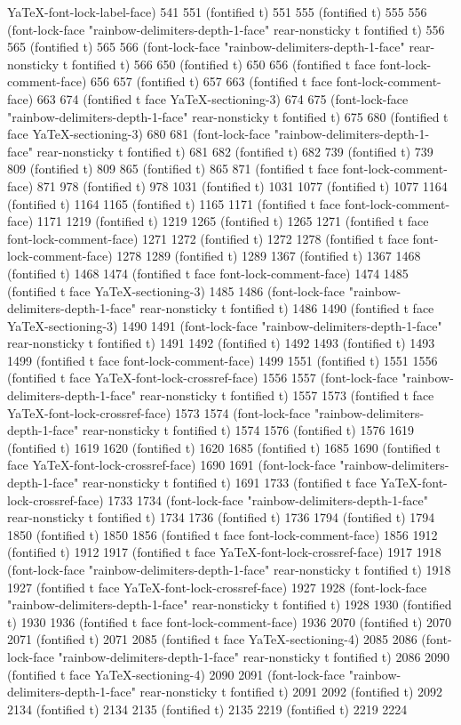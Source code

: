 YaTeX-font-lock-label-face) 541 551 (fontified t) 551 555 (fontified t) 555 556 (font-lock-face "rainbow-delimiters-depth-1-face" rear-nonsticky t fontified t) 556 565 (fontified t) 565 566 (font-lock-face "rainbow-delimiters-depth-1-face" rear-nonsticky t fontified t) 566 650 (fontified t) 650 656 (fontified t face font-lock-comment-face) 656 657 (fontified t) 657 663 (fontified t face font-lock-comment-face) 663 674 (fontified t face YaTeX-sectioning-3) 674 675 (font-lock-face "rainbow-delimiters-depth-1-face" rear-nonsticky t fontified t) 675 680 (fontified t face YaTeX-sectioning-3) 680 681 (font-lock-face "rainbow-delimiters-depth-1-face" rear-nonsticky t fontified t) 681 682 (fontified t) 682 739 (fontified t) 739 809 (fontified t) 809 865 (fontified t) 865 871 (fontified t face font-lock-comment-face) 871 978 (fontified t) 978 1031 (fontified t) 1031 1077 (fontified t) 1077 1164 (fontified t) 1164 1165 (fontified t) 1165 1171 (fontified t face font-lock-comment-face) 1171 1219 (fontified t) 1219 1265 (fontified t) 1265 1271 (fontified t face font-lock-comment-face) 1271 1272 (fontified t) 1272 1278 (fontified t face font-lock-comment-face) 1278 1289 (fontified t) 1289 1367 (fontified t) 1367 1468 (fontified t) 1468 1474 (fontified t face font-lock-comment-face) 1474 1485 (fontified t face YaTeX-sectioning-3) 1485 1486 (font-lock-face "rainbow-delimiters-depth-1-face" rear-nonsticky t fontified t) 1486 1490 (fontified t face YaTeX-sectioning-3) 1490 1491 (font-lock-face "rainbow-delimiters-depth-1-face" rear-nonsticky t fontified t) 1491 1492 (fontified t) 1492 1493 (fontified t) 1493 1499 (fontified t face font-lock-comment-face) 1499 1551 (fontified t) 1551 1556 (fontified t face YaTeX-font-lock-crossref-face) 1556 1557 (font-lock-face "rainbow-delimiters-depth-1-face" rear-nonsticky t fontified t) 1557 1573 (fontified t face YaTeX-font-lock-crossref-face) 1573 1574 (font-lock-face "rainbow-delimiters-depth-1-face" rear-nonsticky t fontified t) 1574 1576 (fontified t) 1576 1619 (fontified t) 1619 1620 (fontified t) 1620 1685 (fontified t) 1685 1690 (fontified t face YaTeX-font-lock-crossref-face) 1690 1691 (font-lock-face "rainbow-delimiters-depth-1-face" rear-nonsticky t fontified t) 1691 1733 (fontified t face YaTeX-font-lock-crossref-face) 1733 1734 (font-lock-face "rainbow-delimiters-depth-1-face" rear-nonsticky t fontified t) 1734 1736 (fontified t) 1736 1794 (fontified t) 1794 1850 (fontified t) 1850 1856 (fontified t face font-lock-comment-face) 1856 1912 (fontified t) 1912 1917 (fontified t face YaTeX-font-lock-crossref-face) 1917 1918 (font-lock-face "rainbow-delimiters-depth-1-face" rear-nonsticky t fontified t) 1918 1927 (fontified t face YaTeX-font-lock-crossref-face) 1927 1928 (font-lock-face "rainbow-delimiters-depth-1-face" rear-nonsticky t fontified t) 1928 1930 (fontified t) 1930 1936 (fontified t face font-lock-comment-face) 1936 2070 (fontified t) 2070 2071 (fontified t) 2071 2085 (fontified t face YaTeX-sectioning-4) 2085 2086 (font-lock-face "rainbow-delimiters-depth-1-face" rear-nonsticky t fontified t) 2086 2090 (fontified t face YaTeX-sectioning-4) 2090 2091 (font-lock-face "rainbow-delimiters-depth-1-face" rear-nonsticky t fontified t) 2091 2092 (fontified t) 2092 2134 (fontified t) 2134 2135 (fontified t) 2135 2219 (fontified t) 2219 2224 